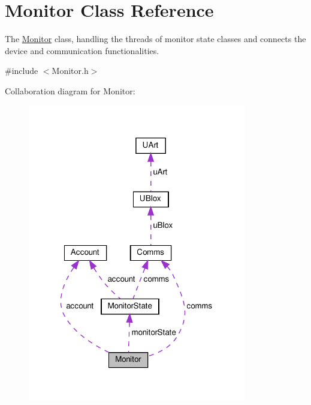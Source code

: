 \hypertarget{class_monitor}{}\section{Monitor Class Reference}
\label{class_monitor}


The \hyperlink{class_monitor}{Monitor} class, handling the threads of monitor state classes and connects the device and communication functionalities.  




{\ttfamily \#include $<$Monitor.\+h$>$}



Collaboration diagram for Monitor\+:
\nopagebreak
\begin{figure}[H]
\begin{center}
\leavevmode
\includegraphics[width=271pt]{d0/d9f/class_monitor__coll__graph}
\end{center}
\end{figure}
